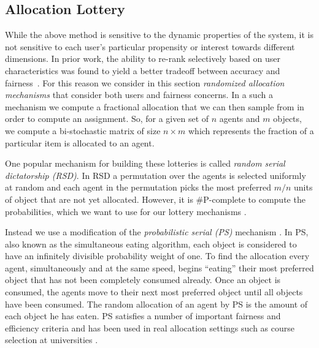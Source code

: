 
\subsection{Allocation Lottery}
While the above method is sensitive to the dynamic properties of the system, it is not sensitive to each user's particular propensity or interest towards different dimensions. In prior work, the ability to re-rank selectively based on user characteristics was found to yield a better tradeoff between accuracy and fairness~\cite{liu2019personalized,sonboli-umap-2020}. For this reason we consider in this section \emph{randomized allocation mechanisms} that consider both users and fairness concerns.  In a such a mechanism we compute a fractional allocation that we can then sample from in order to compute an assignment.  So, for a given set of $n$ agents and $m$ objects, we compute a bi-stochastic matrix of size $n \times m$ which represents the fraction of a particular item is allocated to an agent.

One popular mechanism for building these lotteries is called \emph{random serial dictatorship (RSD)}.  In RSD a permutation over the agents is selected uniformly at random and each agent in the permutation picks the most preferred $m/n$ units of object that are not yet allocated.  However, it is \#P-complete to compute the probabilities, which we want to use for our lottery mechanisms \cite{Aziz:ComplexityRSD}.

Instead we use a modification of the \emph{probabilistic serial (PS)} mechanism \cite{bogomolnaia2001new}.  In PS, also known as the simultaneous eating algorithm, each object is considered to have an infinitely divisible probability weight of one.  To find the allocation every agent, simultaneously and at the same speed, begins ``eating'' their most preferred object that has not been completely consumed already.  Once an object is consumed, the agents move to their next most preferred object until all objects have been consumed. The random allocation of an agent by PS is the amount of each object he has eaten. PS satisfies a number of important fairness and efficiency criteria \cite{Aziz:EqulibriaPS,Aziz:EgalRandom} and has been used in real allocation settings such as course selection at universities \cite{budish2013designing}.

